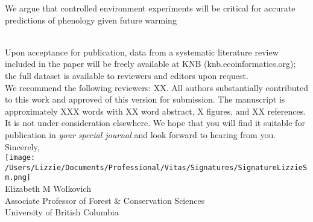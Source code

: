\documentclass[12pt,a4paper]{letter}
\begin{document}
\begin{letter}{}
We argue that controlled environment experiments will be critical for accurate predictions of phenology given future warming

\vspace{1.5ex}\\
Upon acceptance for publication, data from a systematic literature review included in the paper will be freely available at KNB (knb.ecoinformatics.org); the full dataset is available to reviewers and editors upon request. %
\vspace{1.5ex}\\
We recommend the following reviewers: XX.  All authors substantially contributed to this work and approved of this version for submission. The manuscript is approximately XXX words with XX word abstract, X figures, and XX references. It is not under consideration elsewhere. We hope that you will find it suitable for publication in \emph{your special journal} and look forward to hearing from you.
\vspace{1.5ex}\\
Sincerely,\\

\texttt{[image: /Users/Lizzie/Documents/Professional/Vitas/Signatures/SignatureLizzieSm.png]} \\

Elizabeth M Wolkovich\\
Associate Professor of Forest \& Conservation Sciences\\ 
University of British Columbia
\end{letter}
\end{document}
